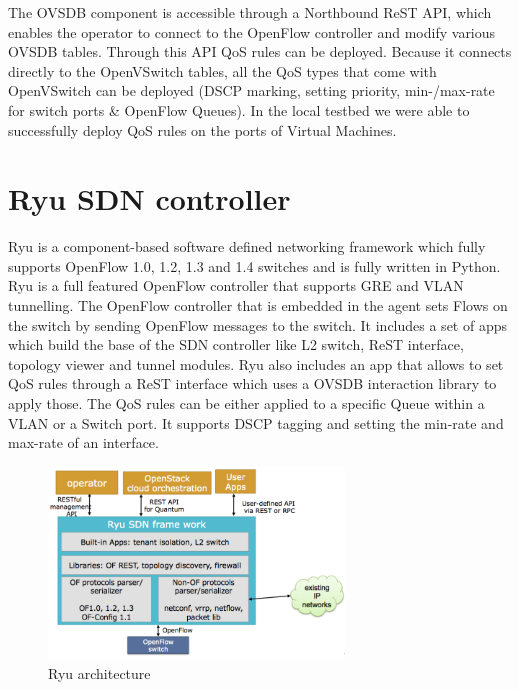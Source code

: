 The OVSDB component is accessible through a Northbound ReST API, which enables the operator to connect to the OpenFlow controller and modify various OVSDB tables. Through this API QoS rules can be deployed. Because it connects directly to the OpenVSwitch tables, all the QoS types that come with OpenVSwitch can be deployed (DSCP marking, setting priority, min-/max-rate for switch ports \& OpenFlow Queues). In the local testbed we were able to successfully deploy QoS rules on the ports of Virtual Machines. 


\section{Ryu SDN controller}


Ryu is a component-based software defined networking framework which fully supports OpenFlow 1.0, 1.2, 1.3 and 1.4 switches and is fully written in Python. Ryu is a full featured OpenFlow controller that supports GRE and VLAN tunnelling. The OpenFlow controller that is embedded in the agent sets Flows on the switch by sending OpenFlow messages to the switch. It includes a set of apps which build the base of the SDN controller like L2 switch, ReST interface, topology viewer and tunnel modules. Ryu also includes an app that allows to set QoS rules through a ReST interface which uses a OVSDB interaction library to apply those. The QoS rules can be either applied to a specific Queue within a VLAN or a Switch port. It supports DSCP tagging and setting the min-rate and max-rate of an interface.

\begin{figure}[H]
\centering
\includegraphics[width=0.7\textwidth]{images/sota/ryu_architecture.png}
\caption{Ryu architecture}
\end{figure}


